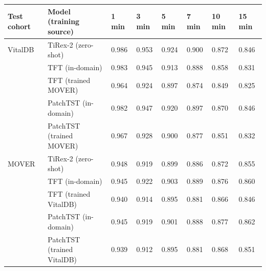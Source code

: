 \begin{tabular}{llllllll}
\hline
Test cohort & Model (training source) & 1 min & 3 min & 5 min & 7 min & 10 min & 15 min \\
\hline
VitalDB & TiRex-2 (zero-shot) & 0.986 & 0.953 & 0.924 & 0.900 & 0.872 & 0.846 \\
 & TFT (in-domain) & 0.983 & 0.945 & 0.913 & 0.888 & 0.858 & 0.831 \\
 & TFT (trained MOVER) & 0.964 & 0.924 & 0.897 & 0.874 & 0.849 & 0.825 \\
 & PatchTST (in-domain) & 0.982 & 0.947 & 0.920 & 0.897 & 0.870 & 0.846 \\
 & PatchTST (trained MOVER) & 0.967 & 0.928 & 0.900 & 0.877 & 0.851 & 0.832 \\
MOVER & TiRex-2 (zero-shot) & 0.948 & 0.919 & 0.899 & 0.886 & 0.872 & 0.855 \\
 & TFT (in-domain) & 0.945 & 0.922 & 0.903 & 0.889 & 0.876 & 0.860 \\
 & TFT (trained VitalDB) & 0.940 & 0.914 & 0.895 & 0.881 & 0.866 & 0.846 \\
 & PatchTST (in-domain) & 0.945 & 0.919 & 0.901 & 0.888 & 0.877 & 0.862 \\
 & PatchTST (trained VitalDB) & 0.939 & 0.912 & 0.895 & 0.881 & 0.868 & 0.851 \\
\hline
\end{tabular}
